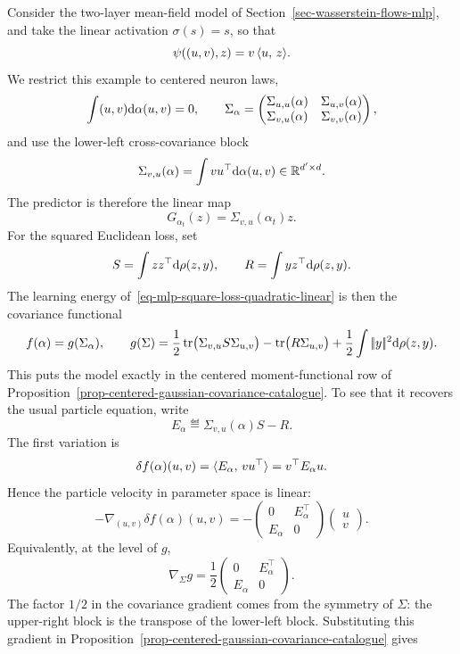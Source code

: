 \begin{example}
	Consider the two-layer mean-field model of Section~\ref{sec-wasserstein-flows-mlp}, and take the linear activation $\sigma(s)=s$, so that
	\[
		\psi((u,v),z)=v\,\langle u,\,z\rangle.
	\]
	We restrict this example to centered neuron laws,
	\[
		\int (u,v)\mathrm{d}\alpha(u,v)=0,
		\qquad
		\Sigma_\alpha=
		\begin{pmatrix}
			\Sigma_{u,u}(\alpha) & \Sigma_{u,v}(\alpha)\\
			\Sigma_{v,u}(\alpha) & \Sigma_{v,v}(\alpha)
		\end{pmatrix},
	\]
	and use the lower-left cross-covariance block
	\[
		\Sigma_{v,u}(\alpha)=\int v u^\top\mathrm{d}\alpha(u,v)\in\mathbb{R}^{d'\times d}.
	\]
	The predictor is therefore the linear map
	\[
		G_{\alpha_t}(z)=\Sigma_{v,u}(\alpha_t)z.
	\]
	For the squared Euclidean loss, set
	\[
		S=\int zz^\top\mathrm{d}\rho(z,y),
		\qquad
		R=\int y z^\top\mathrm{d}\rho(z,y).
	\]
	The learning energy of~\eqref{eq-mlp-square-loss-quadratic-linear} is then the covariance functional
	\[
		f(\alpha)=g(\Sigma_\alpha),
		\qquad
		g(\Sigma)
		=
		\frac12\operatorname{tr}\!\big(\Sigma_{v,u}S\Sigma_{u,v}\big)
		-\operatorname{tr}\!\big(R\Sigma_{u,v}\big)
		+\frac12\int|\!| y |\!|^2\mathrm{d}\rho(z,y).
	\]
	This puts the model exactly in the centered moment-functional row of Proposition~\ref{prop-centered-gaussian-covariance-catalogue}. To see that it recovers the usual particle equation, write
	\[
		E_\alpha\eqdef \Sigma_{v,u}(\alpha)S-R.
	\]
	The first variation is
	\[
		\delta f(\alpha)(u,v)=\langle E_\alpha,\,v u^\top\rangle=v^\top E_\alpha u.
	\]
	Hence the particle velocity in parameter space is linear:
	\[
		-\nabla_{(u,v)}\delta f(\alpha)(u,v)
		=
		-\begin{pmatrix}
			0 & E_\alpha^\top \\
			E_\alpha & 0
		\end{pmatrix}
		\begin{pmatrix} u \\ v \end{pmatrix}.
	\]
	Equivalently, at the level of \(g\),
	\[
		\nabla_\Sigma g=
		\frac12
		\begin{pmatrix}
			0 & E_\alpha^\top\\
			E_\alpha & 0
		\end{pmatrix}.
	\]
	The factor \(1/2\) in the covariance gradient comes from the symmetry of \(\Sigma\): the upper-right block is the transpose of the lower-left block. Substituting this gradient in Proposition~\ref{prop-centered-gaussian-covariance-catalogue} gives

\end{example}
